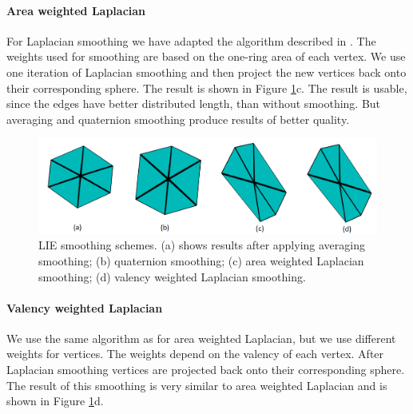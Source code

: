\paragraph{Area weighted Laplacian}
For Laplacian smoothing we have adapted the algorithm described in \cite{laplac_phd}. The weights used for smoothing are based on the one-ring area of each vertex. We use one iteration of Laplacian smoothing and then project the new vertices back onto their corresponding sphere. The result is shown in Figure \ref{fig:smoothing_ilu}c. The result is usable, since the edges have better distributed length, than without smoothing. But averaging and quaternion smoothing produce results of better quality.

\begin{figure}[h]
    \centering
    \includegraphics[width=\textwidth]{images/smoothing_ilu.png}
    \caption[LIE smoothing schemes]{LIE smoothing schemes. (a) shows results after applying averaging smoothing; (b) quaternion smoothing; (c) area weighted Laplacian smoothing; (d) valency weighted Laplacian smoothing.}
    \label{fig:smoothing_ilu}
\end{figure}

\paragraph{Valency weighted Laplacian}
We use the same algorithm as for area weighted Laplacian, but we use different weights for vertices. The weights depend on the valency of each vertex. After Laplacian smoothing vertices are projected back onto their corresponding sphere. The result of this smoothing is very similar to area weighted Laplacian and is shown in Figure \ref{fig:smoothing_ilu}d.

